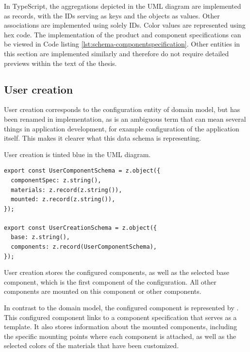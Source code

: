 In TypeScript, the aggregations depicted in the UML diagram are implemented as records, with the IDs serving as keys and the objects as values. Other associations are implemented using solely IDs. Color values are represented using hex code. The implementation of the product and component specifications can be viewed in Code listing \ref{lst:schema-componentspecification}. Other entities in this section are implemented similarly and therefore do not require detailed previews within the text of the thesis.


\subsection{User creation}

User creation corresponds to the configuration entity of domain model, but has been renamed in implementation, as  is an ambiguous term that can mean several things in application development, for example configuration of the application itself. This makes it clearer what this data schema is representing.

User creation is tinted blue in the UML diagram.

\begin{lstlisting}[caption={~User creation schema},label={lst:schema-usercreation},captionpos=b,abovecaptionskip=\medskipamount,belowcaptionskip=\medskipamount]
export const UserComponentSchema = z.object({
  componentSpec: z.string(),
  materials: z.record(z.string()),
  mounted: z.record(z.string()),
});

export const UserCreationSchema = z.object({
  base: z.string(),
  components: z.record(UserComponentSchema),
});
\end{lstlisting}

User creation stores the configured components, as well as the selected base component, which is the first component of the configuration. All other components are mounted on this component or other components.

In contrast to the domain model, the configured component is represented by . This configured component links to a component specification that serves as a template. It also stores information about the mounted components, including the specific mounting points where each component is attached, as well as the selected colors of the materials that have been customized.

